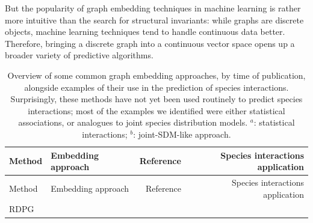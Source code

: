 \documentclass[10pt,oneside]{article}
\begin{document}
But the popularity of graph embedding techniques in machine learning is
rather more intuitive than the search for structural invariants: while
graphs are discrete objects, machine learning techniques tend to handle
continuous data better. Therefore, bringing a discrete graph into a
continuous vector space opens up a broader variety of predictive
algorithms.

\hypertarget{tbl:methods}{}
\begin{longtable}[]{@{}llrr@{}}
\caption{\label{tbl:methods}Overview of some common graph embedding
approaches, by time of publication, alongside examples of their use in
the prediction of species interactions. Surprisingly, these methods have
not yet been used routinely to predict species interactions; most of the
examples we identified were either statistical associations, or
analogues to joint species distribution models. \(^a\): statistical
interactions; \(^b\): joint-SDM-like approach.}\tabularnewline
\toprule
\begin{minipage}[b]{0.11\columnwidth}\raggedright
Method\strut
\end{minipage} & \begin{minipage}[b]{0.32\columnwidth}\raggedright
Embedding approach\strut
\end{minipage} & \begin{minipage}[b]{0.18\columnwidth}\raggedleft
Reference\strut
\end{minipage} & \begin{minipage}[b]{0.28\columnwidth}\raggedleft
Species interactions application\strut
\end{minipage}\tabularnewline
\midrule
\endfirsthead
\toprule
\begin{minipage}[b]{0.11\columnwidth}\raggedright
Method\strut
\end{minipage} & \begin{minipage}[b]{0.32\columnwidth}\raggedright
Embedding approach\strut
\end{minipage} & \begin{minipage}[b]{0.18\columnwidth}\raggedleft
Reference\strut
\end{minipage} & \begin{minipage}[b]{0.28\columnwidth}\raggedleft
Species interactions application\strut
\end{minipage}\tabularnewline
\midrule
\endhead
\begin{minipage}[t]{0.11\columnwidth}\raggedright
RDPG\strut
\end{minipage} & \begin{minipage}[t]{0.32\columnwidth}\raggedright

\end{minipage}
\end{longtable}
\end{document}
